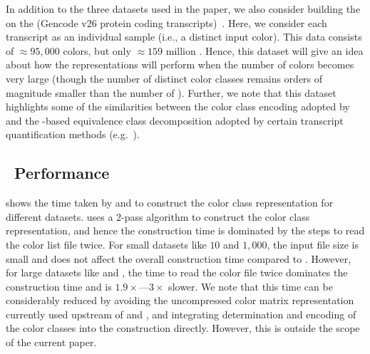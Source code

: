 In addition to the three datasets used in the \vari paper, we also consider
building the \cdbg on the 
(Gencode v26 protein coding transcripts)~\cite{Harrow2012}. Here, we consider
each transcript as an individual sample (i.e., a distinct input color). This
data consists of $\approx95,000$ colors, but only $\approx159$ million \kmers.
Hence, this dataset will give an idea about how the representations
will perform when the number of colors becomes very large (though the number of
distinct color classes remains orders of magnitude smaller than the number of
\kmers). Further, we note that this dataset highlights some of the similarities
between the color class encoding adopted by \system and the \kmer-based
equivalence class decomposition adopted by certain transcript quantification
methods (e.g.~\cite{PatroSailfish:2014}).



\subsection{~Performance}

 shows the time taken by \system and \vari to construct the color
class representation for different datasets. \system uses a $2$-pass algorithm
to construct the color class representation, and hence the construction time is
dominated by the steps to read the color list file twice. For small datasets
like \ecoli $10$ and \ecoli $1,000$, the input file size is small and does not affect
the overall construction time compared to \vari. However, for large datasets
like \plant and \beefsafety, the time to read the color file twice dominates the
construction time and \system is $1.9\times$---$3\times$ slower. We note that
this time can be considerably reduced by avoiding the uncompressed color matrix
representation currently used upstream of \system and \vari, and integrating
determination and encoding of the color classes into the \dbg construction
directly. However, this is outside the scope of the current paper.

